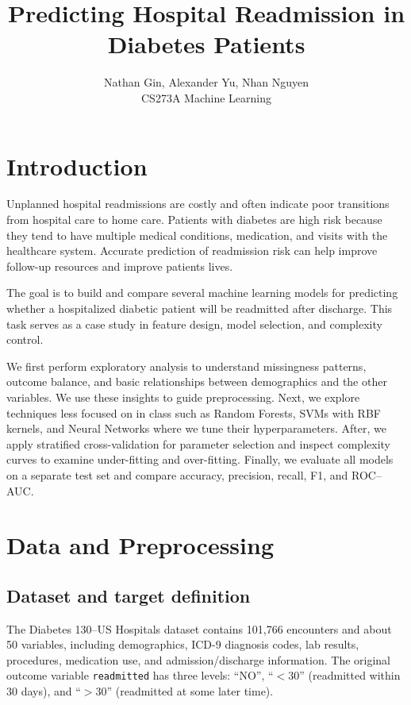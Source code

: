 \documentclass[11pt]{article}
\title{\textbf{Predicting Hospital Readmission in Diabetes Patients}}
\author{Nathan Gin, Alexander Yu, Nhan Nguyen \\
CS273A Machine Learning}
\date{}
\begin{document}
\maketitle

\section{Introduction}

Unplanned hospital readmissions are costly and often indicate poor transitions from hospital care to home care.
Patients with diabetes are high risk because they tend to have multiple medical conditions, medication, and visits with the healthcare system.
Accurate prediction of readmission risk can help improve follow-up resources and improve patients lives.

The goal is to build and compare several machine learning models for predicting whether a hospitalized diabetic patient will be readmitted after discharge.
This task serves as a case study in feature design, model selection, and complexity control. 

We first perform exploratory analysis to understand missingness patterns, outcome balance, and basic relationships between demographics and the other variables. We use these insights to guide preprocessing.
Next, we explore techniques less focused on in class such as Random Forests, SVMs with RBF kernels, and Neural Networks where we tune their hyperparameters.
After, we apply stratified cross-validation for parameter selection and inspect complexity curves to examine under-fitting and over-fitting.
Finally, we evaluate all models on a separate test set and compare accuracy, precision, recall, F1, and ROC--AUC.

\section{Data and Preprocessing}

\subsection{Dataset and target definition}

The Diabetes 130--US Hospitals dataset contains 101{,}766 encounters and about 50 variables, including demographics, ICD-9 diagnosis codes, lab results, procedures, medication use, and admission/discharge information.
The original outcome variable \texttt{readmitted} has three levels: ``NO'', ``$<30$'' (readmitted within 30 days), and ``$>30$'' (readmitted at some later time).
\end{document}
